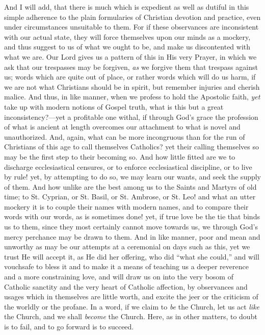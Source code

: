 And I will add, that there is much which is expedient as well as
dutiful in this simple adherence to the plain formularies of Christian
devotion and practice, even under circumstances unsuitable to them.
For if these observances are inconsistent with our actual state, they
will force themselves upon our minds as a mockery, and thus suggest to
us of what we ought to be, and make us discontented with what we are.
Our Lord gives us a pattern of this in His very Prayer, in which we
ask that our trespasses may be forgiven, \emph{as} we forgive them
that trespass against us; words which are quite out of place, or
rather words which will do us harm, if we are not what Christians
should be in spirit, but remember injuries and cherish malice. And
thus, in like manner, when we profess to hold the Apostolic faith, \emph{yet}
take up with modern notions of Gospel truth, what is this but a great
inconsistency?—yet a profitable one withal, if through God's grace
the profession of what is ancient at length overcomes our attachment
to what is novel and unauthorized. And, again, what can be more
incongruous than for the run of Christians of this age to call
themselves Catholics? yet their calling themselves so may be the first
step to their becoming so. And how little fitted are we to discharge
ecclesiastical censures, or to enforce ecclesiastical discipline, or
to live by rule! yet, by attempting to do so, we may learn our wants,
and seek the supply of them. And how unlike are the best among us to
the Saints and Martyrs of old time; to St. Cyprian, or St. Basil, or
St. Ambrose, or St. Leo! and what an utter mockery it is to couple
their names with modern names, and to compare their words with our
words, as is sometimes done! yet, if true love be the tie that binds
us to them, since they most certainly cannot move towards us, we
through God's mercy perchance may be drawn to them. And in like
manner, poor and mean and unworthy as may be our attempts at a
ceremonial on days such as this, yet we trust He will accept it, as He
did her offering, who did ``what she could,'' and will
vouchsafe to bless it and to make it a means of teaching us a deeper
reverence and a more constraining love, and will draw us on into the
very bosom of Catholic sanctity and the very heart of Catholic
affection, by observances and usages which in themselves are little
worth, and excite the jeer or the criticism of the worldly or the
profane. In a word, if we claim to \emph{be} the Church, let us act \emph{like}
the Church, and we shall \emph{become} the Church. Here, as in other
matters, to doubt is to fail, and to go forward is to succeed.

